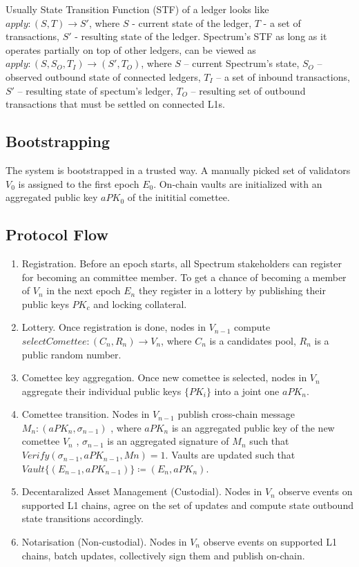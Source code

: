 \documentclass{article}
\begin{document}
    Usually State Transition Function (STF) of a ledger looks like $apply: (S, T) \rightarrow S'$,
    where $S$ - current state of the ledger, $T$ - a set of transactions, $S'$ - resulting state of the ledger.
    Spectrum's STF as long as it operates partially on top of other ledgers, can be viewed
    as $apply: (S, S_O, T_I) \rightarrow (S', T_O)$, where $S$ -- current Spectrum's state,
    $S_O$ -- observed outbound state of connected ledgers, $T_I$ -- a set of inbound transactions,
    $S'$ -- resulting state of spectum's ledger, $T_O$ -- resulting set of outbound transactions
    that must be settled on connected L1s.

    \subsection{Bootstrapping}\label{subsec:bootstrapping}

    The system is bootstrapped in a trusted way.
    A manually picked set of validators $V_0$ is assigned to the first epoch $E_0$.
    On-chain vaults are initialized with an aggregated public key $aPK_0$ of the inititial comettee.

    \subsection{Protocol Flow}\label{subsec:protocol-flow}

    \begin{enumerate}
        \item Registration.
        Before an epoch starts, all Spectrum stakeholders can register for becoming an committee member.
        To get a chance of becoming a member of $V_n$ in the next epoch $E_n$ they register in a lottery
        by publishing their public keys $PK_c$ and locking collateral.
        \item Lottery.
        Once registration is done, nodes in $V_{n-1}$ compute $selectComettee: (C_n, R_n) \rightarrow V_n$,
        where  $C_n$ is a candidates pool, $R_n$ is a public random number.
        \item Comettee key aggregation.
        Once new comettee is selected, nodes in $V_n$ aggregate their individual public keys $\{PK_i\}$ into
        a joint one $aPK_n$.
        \item Comettee transition.
        Nodes in $V_{n-1}$ publish cross-chain message $M_n : (aPK_n, \sigma_{n-1})$ , where $aPK_n$ is
        an aggregated public key of the new comettee $V_n$ , $\sigma_{n-1}$ is an aggregated signature of
        $M_n$ such that $Verify(\sigma_{n-1}, aPK_{n-1}, Mn) = 1$.
        Vaults are updated such that $Vault\{(E_{n-1}, aPK_{n-1})\} \coloneqq (E_n, aPK_n)$.
        \item Decentaralized Asset Management (Custodial).
        Nodes in $V_n$ observe events on supported L1 chains, agree on the set of updates
        and compute state outbound state transitions accordingly.
        \item Notarisation (Non-custodial).
        Nodes in $V_n$ observe events on supported L1 chains, batch updates, collectively sign them and
        publish on-chain.
    \end{enumerate}
\end{document}
